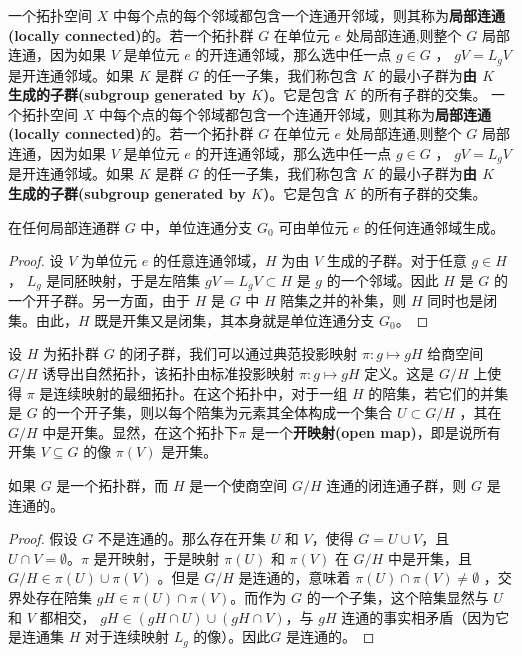 一个拓扑空间 $X$ 中每个点的每个邻域都包含一个连通开邻域，则其称为\textbf{局部连通(locally connected)}的。若一个拓扑群 $G$ 在单位元 $e$ 处局部连通,则整个 $G$ 局部连通，因为如果 $V$ 是单位元 $e$ 的开连通邻域，那么选中任一点 $g\in G$ ， $gV =L_{g} V$ 是开连通邻域。如果 $K$ 是群 $G$ 的任一子集，我们称包含 $K$ 的最小子群为\textbf{由 $K$ 生成的子群(subgroup generated by $ K$)}。它是包含 $K$ 的所有子群的交集。
一个拓扑空间 $X$ 中每个点的每个邻域都包含一个连通开邻域，则其称为\textbf{局部连通(locally connected)}的。若一个拓扑群 $G$ 在单位元 $e$ 处局部连通,则整个 $G$ 局部连通，因为如果 $V$ 是单位元 $e$ 的开连通邻域，那么选中任一点 $g\in G$ ， $gV =L_{g} V$ 是开连通邻域。如果 $K$ 是群 $G$ 的任一子集，我们称包含 $K$ 的最小子群为\textbf{由 $K$ 生成的子群(subgroup generated by $ K$)}。它是包含 $K$ 的所有子群的交集。

\begin{theorem}\label{eg:10.21}
	在任何局部连通群 $G$ 中，单位连通分支 $G_{0}$ 可由单位元 $e$ 的任何连通邻域生成。
\end{theorem}

\begin{proof}
	设 $V$ 为单位元 $e$ 的任意连通邻域，$H$ 为由 $V$ 生成的子群。对于任意 $g\in H$， $L_{g}$ 是同胚映射，于是左陪集 $gV=L_{g} V\subset H$ 是 $g$ 的一个邻域。因此 $H$ 是 $G$ 的一个开子群。另一方面，由于 $H$ 是 $G$ 中 $H$ 陪集之并的补集，则 $H$ 同时也是闭集。由此，$H$ 既是开集又是闭集，其本身就是单位连通分支 $G_{0}$。
\end{proof}

	设 $H$ 为拓扑群 $G$ 的闭子群，我们可以通过典范投影映射 $\pi :g\mapsto gH$ 给商空间 $G/H$ 诱导出自然拓扑，该拓扑由标准投影映射 $\pi :g\mapsto gH$ 定义。这是 $G/H$ 上使得 $\pi $ 是连续映射的最细拓扑。在这个拓扑中，对于一组 $H$ 的陪集，若它们的并集是 $G$ 的一个开子集，则以每个陪集为元素其全体构成一个集合 $U\subset G/H$ ，其在 $G/H$ 中是开集。显然，在这个拓扑下$\pi $ 是一个\textbf{开映射(open map)}，即是说所有开集 $V\subseteq G$ 的像 $\pi (V)$ 是开集。

\begin{theorem}\label{eg:10.22}
	如果 $G$ 是一个拓扑群，而 $H$ 是一个使商空间 $G/H$ 连通的闭连通子群，则 $G$ 是连通的。
\end{theorem}

\begin{proof}
	假设 $G$ 不是连通的。那么存在开集 $U$ 和 $V$，使得 $G=U\cup V$，且 $U\cap V=\emptyset $。$\pi $ 是开映射，于是映射 $\pi (U)$ 和 $\pi (V)$ 在 $G/H$ 中是开集，且 $G/H\in \pi (U)\cup \pi (V)$ 。但是 $G/H$ 是连通的，意味着 $\pi (U)\cap \pi (V)\neq \emptyset $ ，交界处存在陪集 $gH\in \pi (U)\cap \pi (V)$。而作为 $G$ 的一个子集，这个陪集显然与 $ U$ 和 $ V$ 都相交， $gH\in (gH\cap U)\cup (gH\cap V)$，与 $gH$ 连通的事实相矛盾（因为它是连通集 $ H$ 对于连续映射 $L_{g}$ 的像）。因此$G$ 是连通的。
\end{proof}

